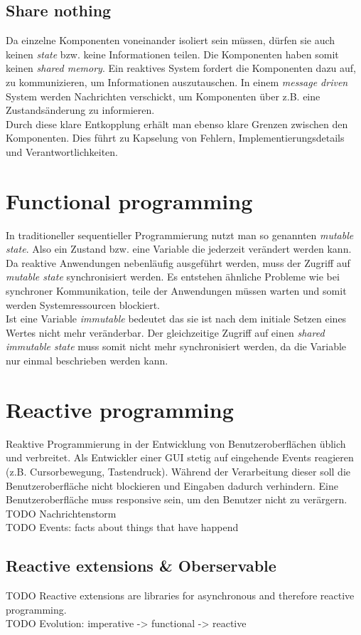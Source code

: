 \subsection{Share nothing}
Da einzelne Komponenten voneinander isoliert sein müssen, dürfen sie auch keinen \textit{state} bzw. keine Informationen teilen. Die Komponenten haben somit keinen \textit{shared memory}. Ein reaktives System fordert die Komponenten dazu auf, zu kommunizieren, um Informationen auszutauschen. In einem \textit{message driven} System werden Nachrichten verschickt, um Komponenten über z.B. eine Zustandsänderung zu informieren.\\
Durch diese klare Entkopplung erhält man ebenso klare Grenzen zwischen den Komponenten. Dies führt zu Kapselung von Fehlern, Implementierungsdetails und Verantwortlichkeiten.


\pagebreak

\section{Functional programming}
In traditioneller sequentieller Programmierung nutzt man so genannten \textit{mutable state}. Also ein Zustand bzw. eine Variable die jederzeit verändert werden kann. Da reaktive Anwendungen nebenläufig ausgeführt werden, muss der Zugriff auf \textit{mutable state} synchronisiert werden. Es entstehen ähnliche Probleme wie bei synchroner Kommunikation, teile der Anwendungen müssen warten und somit werden Systemressourcen blockiert.\\
Ist eine Variable \textit{immutable} bedeutet das sie ist nach dem initiale Setzen eines Wertes nicht mehr veränderbar. Der gleichzeitige Zugriff auf einen \textit{shared immutable state} muss somit nicht mehr synchronisiert werden, da die Variable nur einmal beschrieben werden kann.


\section{Reactive programming}
Reaktive Programmierung in der Entwicklung von Benutzeroberflächen üblich und verbreitet. Als Entwickler einer GUI stetig auf eingehende Events reagieren (z.B. Cursorbewegung, Tastendruck). Während der Verarbeitung dieser soll die Benutzeroberfläche nicht blockieren und Eingaben dadurch verhindern. Eine Benutzeroberfläche muss responsive sein, um den Benutzer nicht zu verärgern.\\

TODO Nachrichtenstorm\\
TODO Events: facts about things that have happend

\subsection{Reactive extensions \& Oberservable}
TODO Reactive extensions are libraries for asynchronous and therefore reactive programming.\\
TODO Evolution: imperative -> functional -> reactive
